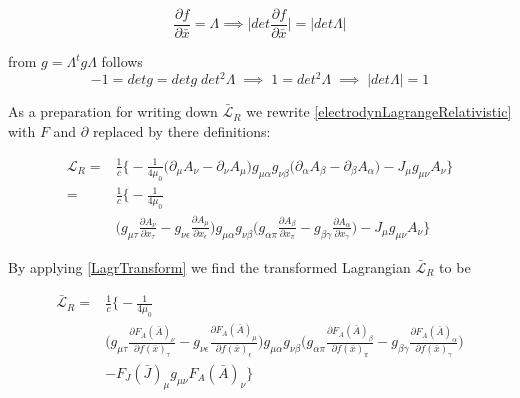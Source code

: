 \documentclass{article}
\begin{document}
\begin{equation}
    \frac{\partial f}{\partial \bar{x}} = \Lambda \implies \bigg| det \frac{\partial f}{\partial \bar{x}} \bigg| = |det \Lambda|
\end{equation}

from $g = \Lambda^t g \Lambda$ follows
\begin{equation} \label{determinantOfLorentzTransform}
    -1 = det g = det g \;  det^2 \Lambda \; \implies \; 1 = det^2 \Lambda \; \implies \; |det \Lambda | = 1
\end{equation}

As a preparation for writing down $\bar{\mathcal{L}}_R$ we rewrite \ref{electrodynLagrangeRelativistic} with $F$ and $\partial$ replaced by there definitions:

\begin{align}
    \mathcal{L}_R = & \frac{1}{c} \bigg\{ -\frac{1}{4\mu_0} \label{LagrangePartialA}
    \big(\partial_\mu A_\nu - \partial_\nu A_\mu \big)
    g_{\mu\alpha} g_{\nu\beta}
    \big(\partial_\alpha A_\beta - \partial_\beta A_\alpha\big) - J_\mu g_{\mu\nu} A_\nu \bigg\}
    \\
     = & \frac{1}{c} \bigg\{ -\frac{1}{4\mu_0}  \nonumber \\
    & \bigg(g_{\mu\tau} \frac{\partial A_\nu}{\partial x_\tau} - g_{\nu\epsilon} \frac{\partial A_\mu}{\partial x_\epsilon} \bigg)
    g_{\mu\alpha} g_{\nu\beta}
    \bigg(g_{\alpha\pi} \frac{\partial A_\beta}{\partial x_\pi} - g_{\beta\gamma} \frac{\partial A_\alpha}{\partial x_\gamma} \bigg) - J_\mu g_{\mu\nu} A_\nu \bigg\}
\end{align}



By applying \ref{LagrTransform} we find the transformed Lagrangian $\bar{\mathcal{L}}_R$ to be

\begin{align}
    \bar{\mathcal{L}}_R = & \frac{1}{c} \bigg\{ -\frac{1}{4\mu_0}  \nonumber \\
    & \bigg(g_{\mu\tau} \frac{\partial F_A(\bar{A})_\nu}{\partial f(\bar{x})_\tau} - g_{\nu\epsilon} \frac{\partial F_A(\bar{A})_\mu}{\partial f(\bar{x})_\epsilon} \bigg)
    g_{\mu\alpha} g_{\nu\beta}
    \bigg(g_{\alpha\pi} \frac{\partial F_A(\bar{A})_\beta}{\partial f(\bar{x})_\pi} - g_{\beta\gamma} \frac{\partial F_A(\bar{A})_\alpha}{\partial f(\bar{x})_\gamma} \bigg) \nonumber \\
    & - F_J(\bar{J})_\mu g_{\mu\nu} F_A(\bar{A})_\nu \bigg\}
\end{align}
\end{document}
